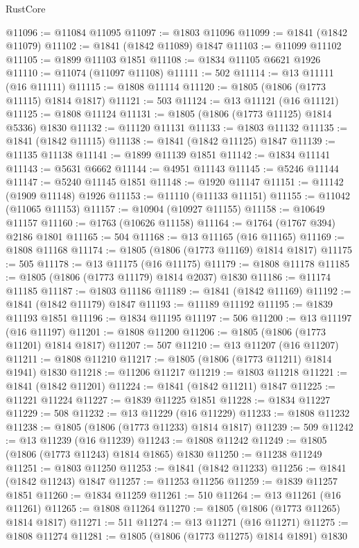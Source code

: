 \begin{lexlean}{RustCore}
\begin{coremodule}
@11096 := @11084 @11095
@11097 := @1803 @11096
@11099 := @1841 (@1842 @11079)
@11102 := @1841 (@1842 @11089) @1847
@11103 := @11099 @11102
@11105 := @1899 @11103 @1851
@11108 := @1834 @11105 @6621 @1926
@11110 := @11074 (@11097 @11108)
@11111 := 502
@11114 := @13 @11111 (@16 @11111)
@11115 := @1808 @11114
@11120 := @1805 (@1806 (@1773 @11115) @1814 @1817)
@11121 := 503
@11124 := @13 @11121 (@16 @11121)
@11125 := @1808 @11124
@11131 := @1805 (@1806 (@1773 @11125) @1814 @5336) @1830
@11132 := @11120 @11131
@11133 := @1803 @11132
@11135 := @1841 (@1842 @11115)
@11138 := @1841 (@1842 @11125) @1847
@11139 := @11135 @11138
@11141 := @1899 @11139 @1851
@11142 := @1834 @11141
@11143 := @5631 @6662
@11144 := @4951 @11143
@11145 := @5246 @11144
@11147 := @5240 @11145 @1851
@11148 := @1920 @11147
@11151 := @11142 (@1909 @11148) @1926
@11153 := @11110 (@11133 @11151)
@11155 := @11042 (@11065 @11153)
@11157 := @10904 (@10927 @11155)
@11158 := @10649 @11157
@11160 := @1763 (@10626 @11158)
@11164 := @1764 (@1767 @394) @2186 @1801
@11165 := 504
@11168 := @13 @11165 (@16 @11165)
@11169 := @1808 @11168
@11174 := @1805 (@1806 (@1773 @11169) @1814 @1817)
@11175 := 505
@11178 := @13 @11175 (@16 @11175)
@11179 := @1808 @11178
@11185 := @1805 (@1806 (@1773 @11179) @1814 @2037) @1830
@11186 := @11174 @11185
@11187 := @1803 @11186
@11189 := @1841 (@1842 @11169)
@11192 := @1841 (@1842 @11179) @1847
@11193 := @11189 @11192
@11195 := @1839 @11193 @1851
@11196 := @1834 @11195
@11197 := 506
@11200 := @13 @11197 (@16 @11197)
@11201 := @1808 @11200
@11206 := @1805 (@1806 (@1773 @11201) @1814 @1817)
@11207 := 507
@11210 := @13 @11207 (@16 @11207)
@11211 := @1808 @11210
@11217 := @1805 (@1806 (@1773 @11211) @1814 @1941) @1830
@11218 := @11206 @11217
@11219 := @1803 @11218
@11221 := @1841 (@1842 @11201)
@11224 := @1841 (@1842 @11211) @1847
@11225 := @11221 @11224
@11227 := @1839 @11225 @1851
@11228 := @1834 @11227
@11229 := 508
@11232 := @13 @11229 (@16 @11229)
@11233 := @1808 @11232
@11238 := @1805 (@1806 (@1773 @11233) @1814 @1817)
@11239 := 509
@11242 := @13 @11239 (@16 @11239)
@11243 := @1808 @11242
@11249 := @1805 (@1806 (@1773 @11243) @1814 @1865) @1830
@11250 := @11238 @11249
@11251 := @1803 @11250
@11253 := @1841 (@1842 @11233)
@11256 := @1841 (@1842 @11243) @1847
@11257 := @11253 @11256
@11259 := @1839 @11257 @1851
@11260 := @1834 @11259
@11261 := 510
@11264 := @13 @11261 (@16 @11261)
@11265 := @1808 @11264
@11270 := @1805 (@1806 (@1773 @11265) @1814 @1817)
@11271 := 511
@11274 := @13 @11271 (@16 @11271)
@11275 := @1808 @11274
@11281 := @1805 (@1806 (@1773 @11275) @1814 @1891) @1830

\end{coremodule}
\end{lexlean}

